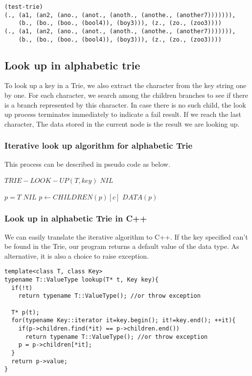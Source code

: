 \documentclass{article}
\begin{document}
\begin{lstlisting}
(test-trie)
(., (a1, (an2, (ano., (anot., (anoth., (anothe., (another7))))))), 
    (b., (bo., (boo., (bool4)), (boy3))), (z., (zo., (zoo3))))
(., (a1, (an2, (ano., (anot., (anoth., (anothe., (another7))))))), 
    (b., (bo., (boo., (bool4)), (boy3))), (z., (zo., (zoo3))))
\end{lstlisting}

\subsection{Look up in alphabetic trie}
To look up a key in a Trie, we also extract the character from the
key string one by one. For each character, we search among the children
branches to see if there is a branch represented by this character.
In case there is no such child, the look up process terminates 
immediately to indicate a fail result. If we reach the last character,
The data stored in the current node is the result we are looking up.

\subsubsection{Iterative look up algorithm for alphabetic Trie}

This process can be described in pseudo code as below.

\begin{algorithmic}
\STATE $TRIE-LOOK-UP(T, key)$
   \RETURN $NIL$ \ENDIF

  \STATE $p=T$
      \RETURN $NIL$
    \ENDIF
    \STATE $p \leftarrow CHILDREN(p)[c]$
  \ENDFOR
  \RETURN $DATA(p)$
\end{algorithmic}

\subsubsection*{Look up in alphabetic Trie in C++}
We can easily translate the iterative algorithm to C++. If the key
specified can't be found in the Trie, our program returns a default
value of the data type. As alternative, it is also a choice to raise
exception.

\lstset{language=C++}
\begin{lstlisting}
template<class T, class Key>
typename T::ValueType lookup(T* t, Key key){
  if(!t)
    return typename T::ValueType(); //or throw exception

  T* p(t);
  for(typename Key::iterator it=key.begin(); it!=key.end(); ++it){
    if(p->children.find(*it) == p->children.end())
      return typename T::ValueType(); //or throw exception
    p = p->children[*it];
  }
  return p->value;
}
\end{lstlisting}
\end{document}
